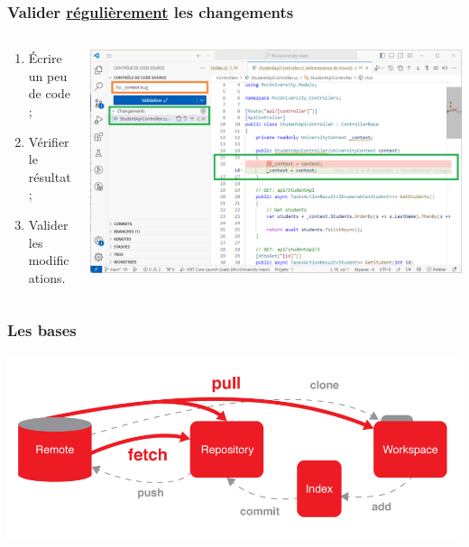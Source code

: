 \begin{frame}
    \frametitle{Valider \underline{régulièrement} les changements}
    \centering
    \begin{columns}
        \begin{column}{0.35\textwidth}
            \begin{enumerate}
                \item Écrire un peu de code ;
                \item Vérifier le résultat ;
                \item Valider les modifications.
            \end{enumerate}
        \end{column}
        \begin{column}{0.65\textwidth}
            \includegraphics[width=\linewidth]{figures/environnement/git-commit}
        \end{column}
    \end{columns}
\end{frame}

\begin{frame}
    \frametitle{Les bases}
    \centering
    \includegraphics[width=\linewidth]{figures/environnement/git-spaces}
\end{frame}

